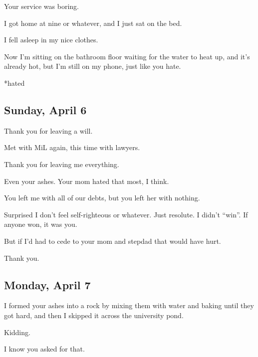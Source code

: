 { Your service was boring.

 I got home at nine or whatever, and I just sat on the bed.

 I fell asleep in my nice clothes.

 Now I'm sitting on the bathroom floor waiting for the water to heat up, and it's already hot, but I'm still on my phone, just like you hate.

*hated

\newpage

\subsection*{Sunday, April 6}\label{sunday-april-6}

 Thank you for leaving a will.

 Met with MiL again, this time with lawyers.

 Thank you for leaving me everything.

 Even your ashes. Your mom hated that most, I think.

 You left me with all of our debts, but you left her with nothing.

 Surprised I don't feel self-righteous or whatever. Just resolute. I didn't ``win''. If anyone won, it was you.

 But if I'd had to cede to your mom and stepdad that would have hurt.

 Thank you.

\newpage

\subsection*{Monday, April 7}\label{monday-april-7}

 I formed your ashes into a rock by mixing them with water and baking until they got hard, and then I skipped it across the university pond.

 Kidding.

 I know you asked for that.

}
